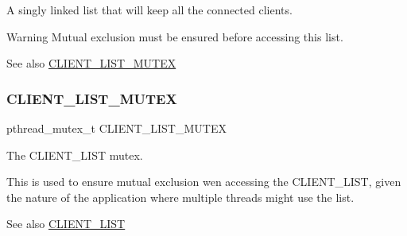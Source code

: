 A singly linked list that will keep all the connected clients. 

\begin{DoxyWarning}{Warning}
Mutual exclusion must be ensured before accessing this list.
\end{DoxyWarning}
\begin{DoxySeeAlso}{See also}
\hyperlink{zip-zop-server_8c_ac58873310e66c9bfafdbc798a8a7c7e2}{C\+L\+I\+E\+N\+T\+\_\+\+L\+I\+S\+T\+\_\+\+M\+U\+T\+EX} 
\end{DoxySeeAlso}
\mbox{\label{zip-zop-server_8c_ac58873310e66c9bfafdbc798a8a7c7e2}} 
\subsubsection{\texorpdfstring{C\+L\+I\+E\+N\+T\+\_\+\+L\+I\+S\+T\+\_\+\+M\+U\+T\+EX}{CLIENT\_LIST\_MUTEX}}
{\footnotesize\ttfamily pthread\+\_\+mutex\+\_\+t C\+L\+I\+E\+N\+T\+\_\+\+L\+I\+S\+T\+\_\+\+M\+U\+T\+EX}



The {\ttfamily C\+L\+I\+E\+N\+T\+\_\+\+L\+I\+ST} mutex. 

This is used to ensure mutual exclusion wen accessing the {\ttfamily C\+L\+I\+E\+N\+T\+\_\+\+L\+I\+ST}, given the nature of the application where multiple threads might use the list.

\begin{DoxySeeAlso}{See also}
\hyperlink{zip-zop-server_8c_a32076dcdfaf1057a014d74d01cc7e08e}{C\+L\+I\+E\+N\+T\+\_\+\+L\+I\+ST} 
\end{DoxySeeAlso}

